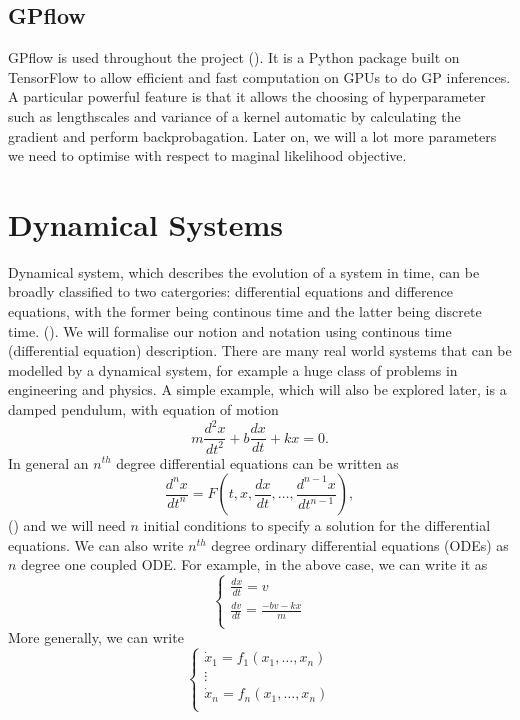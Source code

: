 \documentclass{statsmsc}
\begin{document}
\subsection{GPflow}
GPflow is used throughout the project (\cite{GPflow2017}).
It is a Python package built on TensorFlow to allow efficient and fast computation on GPUs to do GP inferences.
A particular powerful feature is that it allows the choosing of hyperparameter such as lengthscales and variance of a kernel automatic by calculating the gradient and perform backprobagation.
Later on, we will a lot more parameters we need to optimise with respect to maginal likelihood objective.


\section{Dynamical Systems}
Dynamical system, which describes the evolution of a system in time, can be broadly classified to two catergories: differential equations and difference equations, with the former being continous time and the latter being discrete time. (\cite{strogatz_2019}). 
We will formalise our notion and notation using continous time (differential equation) description.
There are many real world systems that can be modelled by a dynamical system, for example a huge class of problems in engineering and physics. 
A simple example, which will also be explored later, is a damped pendulum, with equation of motion
$$
m\frac{d^2x}{dt^2}+b\frac{dx}{dt}+kx=0.
$$
In general an $n^{th}$ degree differential equations can be written as 
$$
\frac{d^{n} x}{d t^{n}}=F\left(t, x, \frac{d x}{d t}, \ldots, \frac{d^{n-1} x}{d t^{n-1}}\right),
$$
(\cite{glendinning_1994}) and we will need $n$ initial conditions to specify a solution for the differential equations.
We can also write $n^{th}$ degree ordinary differential equations (ODEs) as $n$ degree one coupled ODE. 
For example, in the above case, we can write it as 
$$
\begin{cases}
  \frac{dx}{dt} = v\\
  \frac{dv}{dt} = \frac{-bv-kx}{m}\\
\end{cases}
$$
More generally, we can write 
$$
\begin{cases}
  \dot{x}_1=f_1(x_1, \dots, x_n)\\ 
  \vdots\\
  \dot{x}_n=f_n(x_1, \dots, x_n)\\ 
\end{cases}
$$
\end{document}
